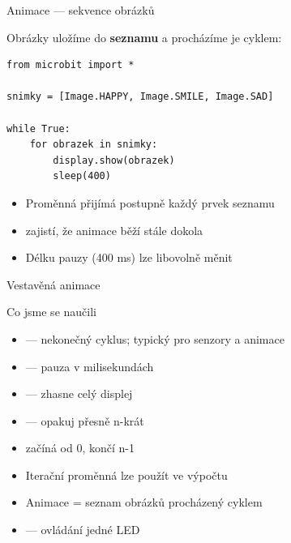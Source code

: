 \begin{frame}[fragile]{Animace — sekvence obrázků}

  Obrázky uložíme do \textbf{seznamu} a procházíme je  cyklem:

  \begin{lstlisting}
from microbit import *

snimky = [Image.HAPPY, Image.SMILE, Image.SAD]

while True:
    for obrazek in snimky:
        display.show(obrazek)
        sleep(400)
  \end{lstlisting}

  \bigskip
  \begin{itemize}
    \item Proměnná  přijímá postupně každý prvek seznamu
    \item {} zajistí, že animace běží stále dokola
    \item Délku pauzy (400 ms) lze libovolně měnit
  \end{itemize}

  \pause\bigskip
  \begin{exampleblock}{Vestavěná animace}
  \end{exampleblock}
\end{frame}

\begin{frame}{Co jsme se naučili}
  \begin{itemize}
    \item[\checkmark]  — nekonečný cyklus; typický pro senzory a animace
    \item[\checkmark]  — pauza v milisekundách
    \item[\checkmark]  — zhasne celý displej
    \item[\checkmark]  — opakuj přesně n-krát
    \item[\checkmark]  začíná od 0, končí n-1
    \item[\checkmark] Iterační proměnná  lze použít ve výpočtu
    \item[\checkmark] Animace = seznam obrázků procházený  cyklem
    \item[\checkmark]  — ovládání jedné LED
  \end{itemize}
\end{frame}


